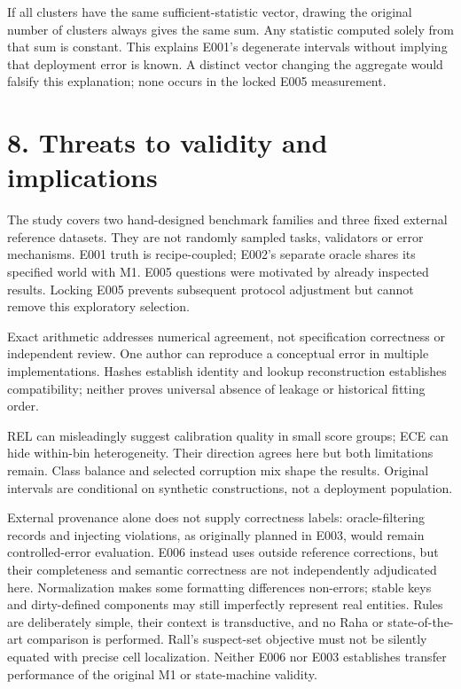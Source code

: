 If all clusters have the same sufficient-statistic vector, drawing the
original number of clusters always gives the same sum. Any statistic
computed solely from that sum is constant. This explains E001's
degenerate intervals without implying that deployment error is known. A
distinct vector changing the aggregate would falsify this explanation;
none occurs in the locked E005 measurement.

\hypertarget{threats-to-validity-and-implications}{%
\section{8. Threats to validity and
implications}\label{threats-to-validity-and-implications}}

The study covers two hand-designed benchmark families and three fixed
external reference datasets. They are not randomly sampled tasks,
validators or error mechanisms. E001 truth is recipe-coupled; E002's
separate oracle shares its specified world with M1. E005 questions were
motivated by already inspected results. Locking E005 prevents subsequent
protocol adjustment but cannot remove this exploratory selection.

Exact arithmetic addresses numerical agreement, not specification
correctness or independent review. One author can reproduce a conceptual
error in multiple implementations. Hashes establish identity and lookup
reconstruction establishes compatibility; neither proves universal
absence of leakage or historical fitting order.

REL can misleadingly suggest calibration quality in small score groups;
ECE can hide within-bin heterogeneity. Their direction agrees here but
both limitations remain. Class balance and selected corruption mix shape
the results. Original intervals are conditional on synthetic
constructions, not a deployment population.

External provenance alone does not supply correctness labels:
oracle-filtering records and injecting violations, as originally planned
in E003, would remain controlled-error evaluation. E006 instead uses
outside reference corrections, but their completeness and semantic
correctness are not independently adjudicated here. Normalization makes
some formatting differences non-errors; stable keys and dirty-defined
components may still imperfectly represent real entities. Rules are
deliberately simple, their context is transductive, and no Raha or
state-of-the-art comparison is performed. Rall's suspect-set objective
must not be silently equated with precise cell localization. Neither
E006 nor E003 establishes transfer performance of the original M1 or
state-machine validity.

